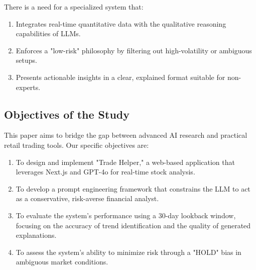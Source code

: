 There is a need for a specialized system that:
\begin{enumerate}
    \item Integrates real-time quantitative data with the qualitative reasoning capabilities of LLMs.
    \item Enforces a "low-risk" philosophy by filtering out high-volatility or ambiguous setups.
    \item Presents actionable insights in a clear, explained format suitable for non-experts.
\end{enumerate}

\subsection{Objectives of the Study}
This paper aims to bridge the gap between advanced AI research and practical retail trading tools. Our specific objectives are:
\begin{enumerate}
    \item To design and implement "Trade Helper," a web-based application that leverages Next.js and GPT-4o for real-time stock analysis.
    \item To develop a prompt engineering framework that constrains the LLM to act as a conservative, risk-averse financial analyst.
    \item To evaluate the system's performance using a 30-day lookback window, focusing on the accuracy of trend identification and the quality of generated explanations.
    \item To assess the system's ability to minimize risk through a "HOLD" bias in ambiguous market conditions.
\end{enumerate}

